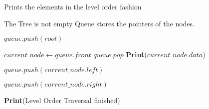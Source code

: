 \documentclass[12pt]{article}
\begin{document}
\begin{algorithm}

  \caption{Prints the elements in the level order fashion}
  \begin{algorithmic}[1]
    \Ensure The Tree is not empty
    \Statex
        \LeftComment Queue stores the pointers of the nodes.
        
        \Statex
        \State $queue.push(root)$
        
            \State $current\_node\gets queue.front $
            \State $queue.pop$
            \State \textbf{Print}($current\_node.data$)
            
                \State $queue.push(current\_node.left)$
            \EndIf
            
                \State $queue.push(current\_node.right)$
            \EndIf
            
        \EndWhile
        \Statex
        \State \textbf{Print}(Level Order Traversal finished)
    \EndFunction
  \end{algorithmic}
  
\end{algorithm}
\end{document}
